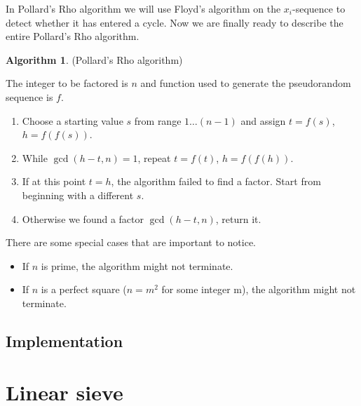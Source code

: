 \documentclass[12pt] {article}
\theoremstyle{plain}
\theoremstyle{definition}
\newtheorem{algo}[thm]{Algorithm}
\begin{document}
In Pollard's Rho algorithm we will use Floyd's algorithm on the $x_i$-sequence to detect whether it has entered a cycle. Now we are finally ready to describe the entire Pollard's Rho algorithm.

\begin{algo} (Pollard's Rho algorithm)

The integer to be factored is $n$ and function used to generate the pseudorandom sequence is $f$.
\begin{enumerate}
\item Choose a starting value $s$ from range $1 \dots (n-1)$ and assign $t = f(s)$, $h = f(f(s))$.
\item While $\gcd(h-t, n) = 1$, repeat $t = f(t)$, $h = f(f(h))$.
\item If at this point $t = h$, the algorithm failed to find a factor. Start from beginning with a different $s$.
\item Otherwise we found a factor $\gcd(h-t, n)$, return it.
\end{enumerate}
\end{algo}

There are some special cases that are important to notice.

\begin{itemize}
\item If $n$ is prime, the algorithm might not terminate.
\item If $n$ is a perfect square ($n = m^2$ for some integer m), the algorithm might not terminate.
\end{itemize}

\subsection {Implementation}

\section {Linear sieve}

\printbibliography
\end{document}
